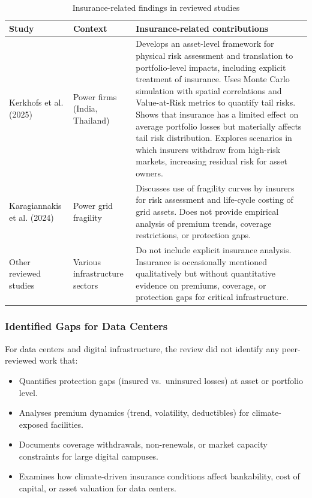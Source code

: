 \begin{table}[H]
\centering
\small
\caption{Insurance-related findings in reviewed studies}
\label{tab:app_lit_insurance}
\begin{tabular}{@{}p{3.5cm}p{3.2cm}p{7.0cm}@{}}
\toprule
\textbf{Study} & \textbf{Context} & \textbf{Insurance-related contributions} \\
\midrule
Kerkhofs et al. (2025) &
Power firms (India, Thailand) &
Develops an asset-level framework for physical risk assessment and
translation to portfolio-level impacts, including explicit treatment of
insurance. Uses Monte Carlo simulation with spatial correlations and
Value-at-Risk metrics to quantify tail risks. Shows that insurance has a
limited effect on average portfolio losses but materially affects tail risk
distribution. Explores scenarios in which insurers withdraw from high-risk
markets, increasing residual risk for asset owners. \\[0.1cm]
Karagiannakis et al. (2024) &
Power grid fragility &
Discusses use of fragility curves by insurers for risk assessment and
life-cycle costing of grid assets. Does not provide empirical analysis of
premium trends, coverage restrictions, or protection gaps. \\[0.1cm]
Other reviewed studies &
Various infrastructure sectors &
Do not include explicit insurance analysis. Insurance is occasionally
mentioned qualitatively but without quantitative evidence on premiums,
coverage, or protection gaps for critical infrastructure. \\
\bottomrule
\end{tabular}
\end{table}

\subsubsection{Identified Gaps for Data Centers}

For data centers and digital infrastructure, the review did not identify any
peer-reviewed work that:

\begin{itemize}
  \item Quantifies protection gaps (insured vs.\ uninsured losses) at asset or
        portfolio level.
  \item Analyses premium dynamics (trend, volatility, deductibles) for
        climate-exposed facilities.
  \item Documents coverage withdrawals, non-renewals, or market capacity
        constraints for large digital campuses.
  \item Examines how climate-driven insurance conditions affect
        bankability, cost of capital, or asset valuation for data centers.
\end{itemize}

